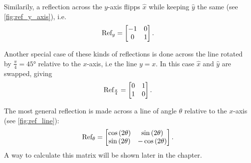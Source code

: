 \begin{descitemize}
		Similarily, a reflection across the $y$-axis flipps $\hat{x}$ while keeping $\hat{y}$ the same (see \autoref{fig:ref_y_axis}), i.e.
		\begin{equation}
			\text{Ref}_{y} = \begin{bmatrix} -1&0 \\ 0&1 \end{bmatrix}. 
		\end{equation}
		
		Another special case of these kinds of reflections is done across the line rotated by $\frac{\pi}{4}=\ang{45}$ relative to the $x$-axis, i.e the line $y=x$. In this case $\hat{x}$ and $\hat{y}$ are swapped, giving
		\begin{equation}
			\text{Ref}_{\frac{\pi}{4}} = \begin{bmatrix} 0&1 \\ 1&0 \end{bmatrix}. 
		\end{equation}

		The most general reflection is made across a line of angle $\theta$ relative to the $x$-axis (see \autoref{fig:ref_line}):
		\begin{equation}
			\text{Ref}_{\theta} = \begin{bmatrix} \cos \left( 2\theta \right) & \sin \left( 2\theta \right) \\ \sin \left( 2\theta \right) & -\cos \left( 2\theta \right) \end{bmatrix}.
		\end{equation}
		A way to calculate this matrix will be shown later in the chapter.


\end{descitemize}
